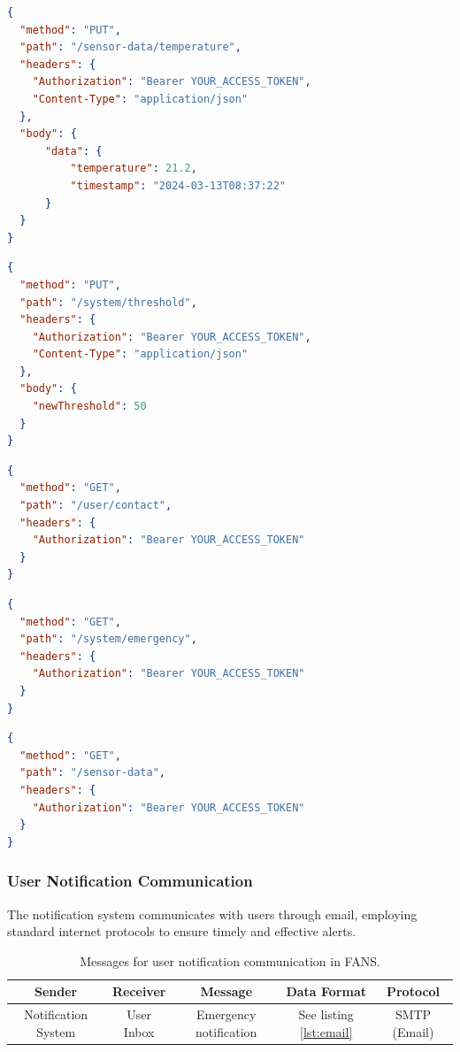 \begin{lstlisting}[language=json,label={lst:sensor},caption={Update sensor data message.}]
{
  "method": "PUT",
  "path": "/sensor-data/temperature",
  "headers": {
    "Authorization": "Bearer YOUR_ACCESS_TOKEN",
    "Content-Type": "application/json"
  },
  "body": {
      "data": {
          "temperature": 21.2,
          "timestamp": "2024-03-13T08:37:22"
      }
  }
}
\end{lstlisting}

\begin{lstlisting}[language=json,label={lst:threshold},caption={Threshold update message.}]
{
  "method": "PUT",
  "path": "/system/threshold",
  "headers": {
    "Authorization": "Bearer YOUR_ACCESS_TOKEN",
    "Content-Type": "application/json"
  },
  "body": {
    "newThreshold": 50
  }
}
\end{lstlisting}

\begin{lstlisting}[language=json,label={lst:contact},caption={Request for user contact information.}]
{
  "method": "GET",
  "path": "/user/contact",
  "headers": {
    "Authorization": "Bearer YOUR_ACCESS_TOKEN"
  }
}
\end{lstlisting}

\begin{lstlisting}[language=json,label={lst:emergency},caption={Request for emergency flag.}]
{
  "method": "GET",
  "path": "/system/emergency",
  "headers": {
    "Authorization": "Bearer YOUR_ACCESS_TOKEN"
  }
}
\end{lstlisting}

\begin{lstlisting}[language=json,label={lst:sensor-get},caption={Request for latest sensor data.}]
{
  "method": "GET",
  "path": "/sensor-data",
  "headers": {
    "Authorization": "Bearer YOUR_ACCESS_TOKEN"
  }
}
\end{lstlisting}

\subsubsection{User Notification Communication}

The notification system communicates with users through email, employing standard internet protocols to ensure timely
and effective alerts.

\begin{table}[H]
    \centering
    \begin{tabular}{| c | c | c | c | c |}
        \hline
        Sender              & Receiver   & Message                & Data Format                 & Protocol     \\
        \hline
        Notification System & User Inbox & Emergency notification & See listing \ref{lst:email} & SMTP (Email) \\
        \hline
    \end{tabular}
    \caption{Messages for user notification communication in FANS.}
\end{table}

